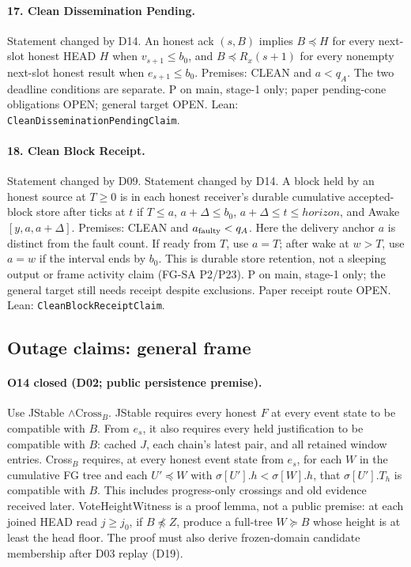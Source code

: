 \documentclass{article}
\newcommand{\nm}[1]{\nolinkurl{#1}}
\begin{document}
\paragraph{17. Clean Dissemination Pending.}
Statement changed by D14.
An honest ack $(s,B)$ implies $B\preceq H$ for every next-slot honest HEAD $H$ when $v_{s+1}\leq b_0$, and $B\preceq R_x(s+1)$ for every nonempty next-slot honest result when $e_{s+1}\leq b_0$. Premises: CLEAN and $a<q_A$. The two deadline conditions are separate. P on main, stage-1 only; paper pending-cone obligations OPEN; general target OPEN.
Lean: \nm{CleanDisseminationPendingClaim}.

\paragraph{18. Clean Block Receipt.}
Statement changed by D09. Statement changed by D14.
A block held by an honest source at $T\geq0$ is in each honest receiver's durable cumulative accepted-block store after ticks at $t$ if $T\leq a$, $a+\Delta\leq b_0$, $a+\Delta\leq t\leq\mathit{horizon}$, and Awake$[y,a,a+\Delta]$. Premises: CLEAN and $a_{\rm faulty}<q_A$. Here the delivery anchor $a$ is distinct from the fault count. If ready from $T$, use $a=T$; after wake at $w>T$, use $a=w$ if the interval ends by $b_0$. This is durable store retention, not a sleeping output or frame activity claim (FG-SA P2/P23). P on main, stage-1 only; the general target still needs receipt despite exclusions. Paper receipt route OPEN.
Lean: \nm{CleanBlockReceiptClaim}.

\subsection{Outage claims: general frame}

\paragraph{O14 closed (D02; public persistence premise).}
Use JStable $\wedge\mathrm{Cross}_B$. JStable requires every honest $F$
at every event state to be compatible with $B$. From $e_s$, it also
requires every held justification to be compatible with $B$: cached $J$,
each chain's latest pair, and all retained window entries.
Cross$_B$ requires, at every honest event state from $e_s$, for each
$W$ in the cumulative FG tree and each $U'\preceq W$ with
$\sigma[U'].h<\sigma[W].h$, that $\sigma[U'].T_h$ is compatible with $B$.
This includes progress-only crossings and old evidence received later.
VoteHeightWitness is a proof lemma, not a public premise: at each joined
HEAD read $j\geq j_0$, if $B\not\preceq Z$, produce a full-tree
$W\succeq B$ whose height is at least the head floor.
The proof must also derive frozen-domain candidate membership after D03 replay (D19).
\end{document}

